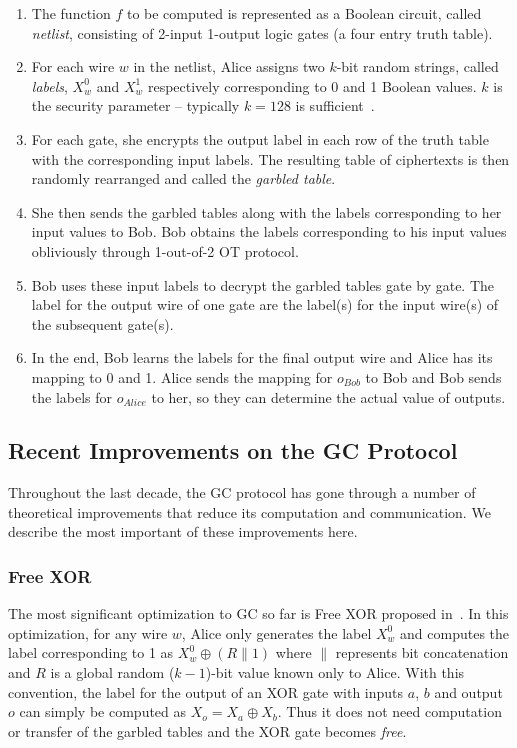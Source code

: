 \begin{enumerate}[label=\roman*.]
\item The function $f$ to be computed is represented as a Boolean circuit, called \textit{netlist}, consisting of 2-input 1-output logic gates (a four entry truth table).
\item For each wire $w$ in the netlist, Alice assigns two $k$-bit random strings, called \textit{labels}, $X_w^{0}$ and $X_w^{1}$ respectively corresponding to 0 and 1 Boolean values.
      $k$ is the security parameter -- typically $k=128$ is sufficient~\cite{bellare2013efficient}.
\item For each gate, she encrypts the output label in each row of the truth table with the corresponding input labels.
      The resulting table of ciphertexts is then randomly rearranged and called the \textit{garbled table}.
\item She then sends the garbled tables along with the labels corresponding to her input values to Bob.
      Bob obtains the labels corresponding to his input values obliviously through 1-out-of-2 OT protocol.
\item Bob uses these input labels to decrypt the garbled tables gate by gate.
      The label for the output wire of one gate are the label(s) for the input wire(s) of the subsequent gate(s).
\item In the end, Bob learns the labels for the final output wire and Alice has its mapping to 0 and 1.
      Alice sends the mapping for $o_{Bob}$ to Bob and Bob sends the labels for $o_{Alice}$ to her, so they can determine the actual value of outputs.
\end{enumerate}

\subsection{Recent Improvements on the GC Protocol}\label{ssec:prelim-imp}
Throughout the last decade, the GC protocol has gone through a number of theoretical improvements that reduce its computation and communication.
We describe the most important of these improvements here.

\subsubsection{Free XOR}\label{sssec:prelim-freexor}
The most significant optimization to GC so far is Free XOR proposed in~\cite{kolesnikov2008improved}.
In this optimization, for any wire $w$, Alice only generates the label $X_w^{0}$ and computes the label corresponding to 1 as $X_w^{0}\oplus (R \parallel 1)$ where $\parallel$ represents bit concatenation and
$R$ is a global random ($k-1$)-bit value known only to Alice.
With this convention, the label for the output of an XOR gate with inputs $a$, $b$ and output $o$ can simply be computed as $X_{o} = X_{a} \oplus X_{b}$.
Thus it does not need computation or transfer of the garbled tables and the XOR gate becomes \textit{free}.


